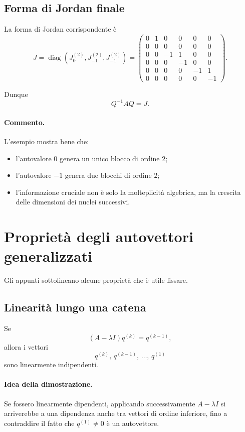 \subsection{Forma di Jordan finale}

La forma di Jordan corrispondente è
\begin{equation}
J=
\operatorname{diag}\!\left(
J_0^{(2)},
J_{-1}^{(2)},
J_{-1}^{(2)}
\right)
=
\begin{pmatrix}
0 & 1 & 0 & 0 & 0 & 0\\
0 & 0 & 0 & 0 & 0 & 0\\
0 & 0 & -1 & 1 & 0 & 0\\
0 & 0 & 0 & -1 & 0 & 0\\
0 & 0 & 0 & 0 & -1 & 1\\
0 & 0 & 0 & 0 & 0 & -1
\end{pmatrix}.
\label{eq:L7_example_J}
\end{equation}

Dunque
\[
Q^{-1}AQ=J.
\]

\paragraph{Commento.}
L'esempio mostra bene che:
\begin{itemize}
    \item l'autovalore $0$ genera un unico blocco di ordine $2$;
    \item l'autovalore $-1$ genera due blocchi di ordine $2$;
    \item l'informazione cruciale non è solo la molteplicità algebrica, ma la crescita delle dimensioni dei nuclei successivi.
\end{itemize}

\section{Proprietà degli autovettori generalizzati}

Gli appunti sottolineano alcune proprietà che è utile fissare.

\subsection{Linearità lungo una catena}

Se
\[
(A-\lambda I)q^{(k)}=q^{(k-1)},
\]
allora i vettori
\[
q^{(k)},\,q^{(k-1)},\,\dots,\,q^{(1)}
\]
sono linearmente indipendenti.

\paragraph{Idea della dimostrazione.}
Se fossero linearmente dipendenti, applicando successivamente $A-\lambda I$ si arriverebbe a una dipendenza anche tra vettori di ordine inferiore, fino a contraddire il fatto che $q^{(1)}\neq 0$ è un autovettore.

